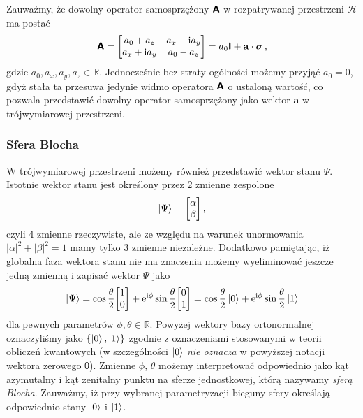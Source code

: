 \documentclass{myclass}
\begin{document}
Zauważmy, że dowolny operator samosprzężony \(\boldsymbol{\mathsf{A}}\) w rozpatrywanej przestrzeni \(\mathscr{H}\)
ma postać
\begin{equation*}
    \oper{A} = \mqty[a_0 + a_z & a_x - \im a_y \\ a_x + \im a_y & a_0 - a_z] = a_0\oper{I} + \mathbf{a}\cdot\boldsymbol{\sigma}\,, 
\end{equation*}
gdzie \(a_0,a_x,a_y,a_z \in \mathbb{R}\). Jednocześnie bez straty ogólności możemy przyjąć \(a_0 =
0\), gdyż stała ta przesuwa jedynie widmo operatora \(\boldsymbol{\mathsf{A}}\) o ustaloną wartość, co pozwala
przedstawić dowolny operator samosprzężony jako wektor \(\mathbf{a}\) w trójwymiarowej przestrzeni.

\subsubsection{Sfera Blocha}

W trójwymiarowej przestrzeni możemy również przedstawić wektor stanu \(\Psi\). Istotnie wektor stanu
jest określony przez 2 zmienne zespolone
\begin{equation*}
    \ket{\Psi} = \mqty[\alpha \\ \beta]\,,
\end{equation*}
czyli 4 zmienne rzeczywiste, ale ze względu na warunek unormowania \(|\alpha|^2 + |\beta|^2 = 1\)
mamy tylko 3 zmienne niezależne. Dodatkowo pamiętając, iż globalna faza wektora stanu nie ma
znaczenia możemy wyeliminować jeszcze jedną zmienną i zapisać wektor \(\Psi\) jako
\begin{equation*}
    \ket{\Psi} = \cos\frac{\theta}{2}\mqty[1 \\ 0] + \e^{\im\phi}\sin\frac{\theta}{2}\mqty[0\\1] = \cos\frac{\theta}{2}\ket{0} + \e^{\im\phi}\sin\frac{\theta}{2}\ket{1}
\end{equation*}
dla pewnych parametrów \(\phi,\theta\in\mathbb{R}\). Powyżej wektory bazy ortonormalnej oznaczyliśmy
jako \(\{\ket{0}, \ket{1}\}\) zgodnie z oznaczeniami stosowanymi w teorii obliczeń kwantowych (w
szczególności \(\ket{0}\) \textit{nie oznacza} w powyższej notacji wektora zerowego \(\mathsf{0}\)).
Zmienne \(\phi\), \(\theta\) możemy interpretować odpowiednio jako kąt azymutalny i kąt zenitalny
punktu na sferze jednostkowej, którą nazywamy \textit{sferą Blocha}. Zauważmy, iż przy wybranej
parametryzacji bieguny sfery określają odpowiednio stany \(\ket{0}\) i \(\ket{1}\).
\end{document}
